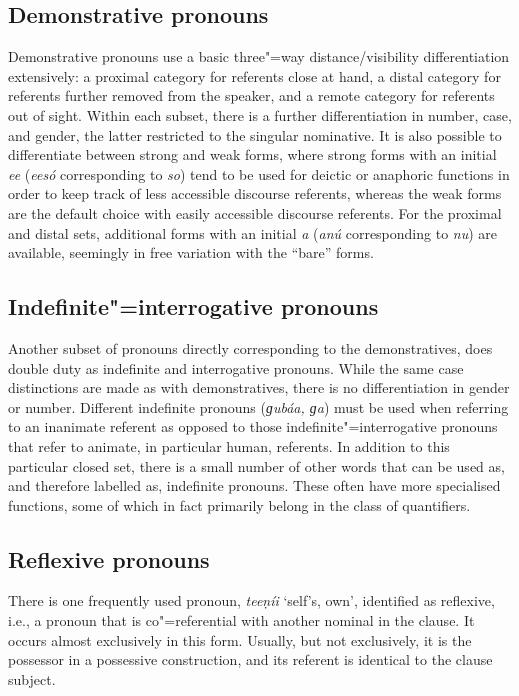 \subsection{Demonstrative pronouns}
\label{subsec:3b-6-2}
Demonstrative pronouns use a basic three"=way distance/visibility differentiation extensively: a proximal category for referents close at hand, a distal category for referents further removed from the speaker, and a remote category for referents out of sight. Within each subset, there is a further differentiation in number, case, and gender, the latter restricted to the singular nominative. It is also possible to differentiate between strong and weak forms, where strong forms with an initial \textit{ee} (\textit{eesó} corresponding to \textit{so}) tend to be used for deictic or anaphoric functions in order to keep track of less accessible discourse referents, whereas the weak forms are the default choice with easily accessible discourse referents. For the proximal and distal sets, additional forms with an initial \textit{a} (\textit{anú} corresponding to \textit{nu}) are available, seemingly in free variation with the ``bare'' forms.


\subsection{Indefinite"=interrogative pronouns}
\label{subsec:3b-6-3}
Another subset of pronouns directly corresponding to the demonstratives, does double duty as indefinite and interrogative pronouns. While the same case distinctions are made as with demonstratives, there is no differentiation in gender or number. Different indefinite pronouns (\textit{ɡubáa, ɡa}) must be used when referring to an inanimate referent as opposed to those indefinite"=interrogative pronouns that refer to animate, in particular human, referents. In addition to this particular closed set, there is a small number of other words that can be used as, and therefore labelled as, indefinite pronouns. These often have more specialised functions, some of which in fact primarily belong in the class of quantifiers.


\subsection{Reflexive pronouns}
\label{subsec:3b-6-4}
There is one frequently used pronoun, \textit{teeṇíi} `self’s, own', identified as reflexive, i.e., a pronoun that is co"=referential with another nominal in the clause. It occurs almost exclusively in this form. Usually, but not exclusively, it is the possessor in a possessive construction, and its referent is identical to the clause subject.



